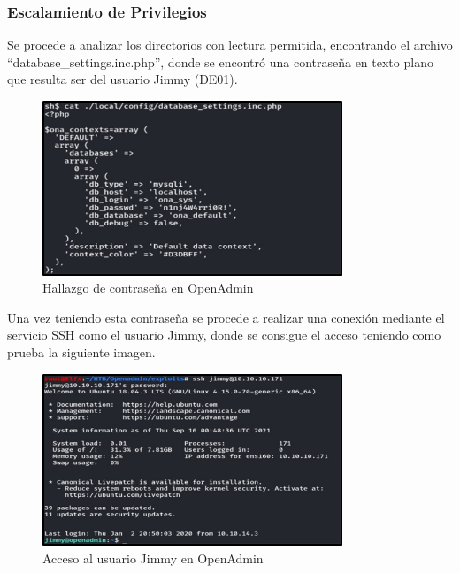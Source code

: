 \subsubsection{Escalamiento de Privilegios}
Se procede a analizar los directorios con lectura permitida, encontrando el archivo “database\_settings.inc.php”, donde se encontró una contraseña en texto plano que resulta ser del usuario Jimmy (DE01).
\begin{figure}[H]
    \centering
    \includegraphics[width=0.8\textwidth]{imagenes/contsql.png}
    \caption{Hallazgo de contraseña en OpenAdmin}
\end{figure}
Una vez teniendo esta contraseña se procede a realizar una conexión mediante el servicio SSH como el usuario Jimmy, donde se consigue el acceso teniendo como prueba la siguiente imagen.
\par
\begin{figure}[H]
    \centering
    \includegraphics[width=0.8\textwidth]{imagenes/acjim.png}
    \caption{Acceso al usuario Jimmy en OpenAdmin}
\end{figure}

